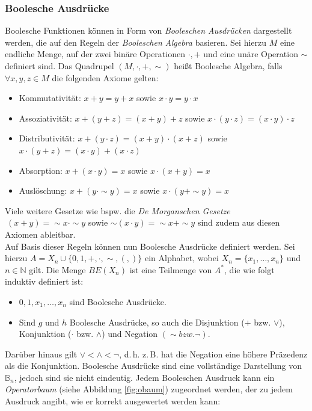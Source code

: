 \subsubsection{Boolesche Ausdrücke}
\label{sec:bAusdruecke}
Boolesche Funktionen können in Form von \emph{Booleschen Ausdrücken} dargestellt werden, die auf den Regeln der \emph{Booleschen Algebra} basieren. Sei hierzu $M$ eine endliche Menge, auf der zwei binäre Operationen $\cdot, +$ und eine unäre Operation $\sim$ definiert sind. Das Quadrupel $(M, \cdot, +, \sim)$ heißt Boolesche Algebra, falls $\forall x, y, z \in M$ die folgenden Axiome gelten:
\begin{itemize}
	\item Kommutativität: $x+y = y+x$ sowie $x \cdot y = y \cdot x$
	\item Assoziativität: $x+(y+z) = (x+y)+z$ sowie $x\cdot(y\cdot z) = (x \cdot y) \cdot z$
	\item Distributivität: $x + (y \cdot z) = (x+y) \cdot (x+z)$ sowie $x \cdot (y+z) = (x \cdot y) + (x \cdot z)$
	\item Absorption: $x+(x \cdot y) = x$ sowie $x \cdot (x+y) = x$
	\item Auslöschung: $x+(y\cdot \sim y) = x$ sowie $x \cdot(y+\sim y) = x$
\end{itemize}
Viele weitere Gesetze wie bspw. die \emph{De Morganschen Gesetze} $~(x+y) = \sim x \cdot \sim y$ sowie $\sim(x \cdot y) = \sim x + \sim y$ sind zudem aus diesen Axiomen ableitbar.\\
Auf Basis dieser Regeln können nun Boolesche Ausdrücke definiert werden. Sei hierzu $A = X_n \cup \{ 0, 1, +, \cdot, \sim, (,) \}$ ein Alphabet, wobei $X_n = \{ x_1, \dots, x_n \}$ und $n \in \mathbb{N}$ gilt. Die Menge $BE(X_n)$ ist eine Teilmenge von $A^*$, die wie folgt induktiv definiert ist:
\begin{itemize}
	\item $0, 1, x_1, \dots, x_n$ sind Boolesche Ausdrücke.
	\item Sind $g$ und $h$ Boolesche Ausdrücke, so auch die Disjunktion ($+$ bzw. $\vee$), Konjunktion ($\cdot$ bzw. $\wedge$) und Negation $(\sim bzw. \neg)$.
\end{itemize}
Darüber hinaus gilt $\vee < \wedge < \neg$, d.\,h. z.\,B. hat die Negation eine höhere Präzedenz als die Konjunktion. Boolesche Ausdrücke sind eine vollständige Darstellung von $\mathbb{B}_n$, jedoch sind sie nicht eindeutig. Jedem Booleschen Ausdruck kann ein \emph{Operatorbaum} (siehe Abbildung \ref{fig:obaum}) zugeordnet werden, der zu jedem Ausdruck angibt, wie er korrekt ausgewertet werden kann:
